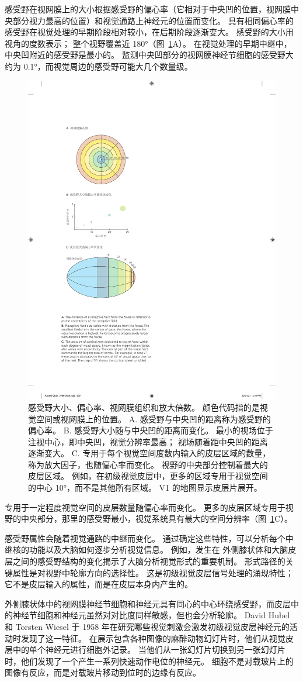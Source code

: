 感受野在视网膜上的大小根据感受野的偏心率（它相对于中央凹的位置，视网膜中央部分视力最高的位置）和视觉通路上神经元的位置而变化。
具有相同偏心率的感受野在视觉处理的早期阶段相对较小，在后期阶段逐渐变大。
感受野的大小用视角的度数表示；
整个视野覆盖近 180°（图~\ref{fig:21_10}A）。
在视觉处理的早期中继中，中央凹附近的感受野是最小的。
监测中央凹部分的视网膜神经节细胞的感受野大约为 0.1°，而视觉周边的感受野可能大几个数量级。


\begin{figure}[htbp]
	\centering
	\includegraphics[width=0.5\linewidth]{chap21/fig_21_10}
	\caption{感受野大小、偏心率、视网膜组织和放大倍数。
		颜色代码指的是视觉空间或视网膜上的位置。
		A. 感受野与中央凹的距离称为感受野的偏心率。
		B. 感受野大小随与中央凹的距离而变化。
		最小的视场位于注视中心，即中央凹，视觉分辨率最高；
		视场随着距中央凹的距离逐渐变大。
		C. 专用于每个视觉空间度数内输入的皮层区域的数量，称为放大因子，也随偏心率而变化。
		视野的中央部分控制着最大的皮层区域。
		例如，在初级视觉皮层中，更多的区域专用于视觉空间的中心 10°，而不是其他所有区域。
		V1 的地图显示皮层片展开。}
	\label{fig:21_10}
\end{figure}


专用于一定程度视觉空间的皮层数量随偏心率而变化。 更多的皮层区域专用于视野的中央部分，那里的感受野最小，视觉系统具有最大的空间分辨率（图~\ref{fig:21_10}C）。


感受野属性会随着视觉通路的中继而变化。
通过确定这些特性，可以分析每个中继核的功能以及大脑如何逐步分析视觉信息。
例如，发生在 外侧膝状体和大脑皮层之间的感受野结构的变化揭示了大脑分析视觉形式的重要机制。
形式路径的关键属性是对视野中轮廓方向的选择性。
这是初级视觉皮层信号处理的涌现特性；
它不是皮层输入的属性，而是在皮层本身内产生的。


外侧膝状体中的视网膜神经节细胞和神经元具有同心的中心环绕感受野，而皮层中的神经节细胞和神经元虽然对对比度同样敏感，但也会分析轮廓。
David Hubel 和 Torsten Wiesel 于 1958 年在研究哪些视觉刺激会激发初级视觉皮层神经元的活动时发现了这一特征。
在展示包含各种图像的麻醉动物幻灯片时，他们从视觉皮层中的单个神经元进行细胞外记录。
当他们从一张幻灯片切换到另一张幻灯片时，他们发现了一个产生一系列快速动作电位的神经元。
细胞不是对载玻片上的图像有反应，而是对载玻片移动到位时的边缘有反应。



